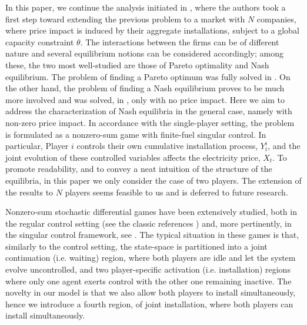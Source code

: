 \documentclass[10pt]{article}
\numberwithin{equation}{section}
\theoremstyle{plain}
\numberwithin{theorem}{section}
\theoremstyle{definition}
\newcommand{\<}{\langle}
\renewcommand{\>}{\rangle}
\renewcommand{\(}{\left(}
\renewcommand{\)}{\right)}
\begin{document}
{{In this paper, we continue %
the analysis initiated in \cite{MR4352705}, where the authors took a first step toward extending the previous problem to a market with $N$ companies, where price impact is induced by their aggregate installations, subject to a global capacity constraint $\theta$. The interactions between the firms can be of different nature and several equilibrium notions can be considered accordingly; among these, the two most well-studied are those of Pareto optimality and Nash equilibrium.
The problem of finding a Pareto optimum was fully solved in \cite{MR4352705}. On the other hand, the problem of finding a Nash equilibrium proves to be much more involved and was solved, in \cite{MR4352705}, only with no price impact. 
Here we aim to address the characterization of Nash equilibria in the general case, namely with non-zero price impact. In accordance with the single-player setting, the problem is formulated as a nonzero-sum game with finite-fuel singular control. In particular, Player $i$ controls their own cumulative installation process, $Y^i_t$, and the joint evolution of these controlled variables affects the electricity price, $X_t$. To promote readability, and to convey a neat intuition of the structure of the equilibria, in this paper we only consider the case of two players. The extension of the results to $N$ players seems feasible to us and is deferred to future research.}

Nonzero-sum stochastic differential games have been extensively studied, both in the regular control setting (see the classic references \cite{Basar1998,MR3752669}) and, more pertinently, in the singular control framework, see \cite{MR3832877, MR3770874, MR3914565, MR4332850, MR4395163}. The typical situation in these games is that, similarly to the control setting, the state-space is partitioned into a joint continuation (i.e. waiting) region, where both players are idle and let the system evolve uncontrolled, and two player-specific activation (i.e. installation) regions where only one agent exerts control with the other one remaining inactive. The novelty in our model is that we also allow both players to install simultaneously, hence we introduce a fourth region, of joint installation, where both players can install simultaneously. 


}
\end{document}
